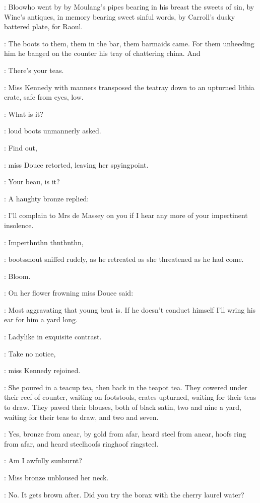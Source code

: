 :
Bloowho went by by Moulang's pipes bearing in his breast the sweets
of sin, by Wine's antiques, in memory bearing sweet sinful words, by
Carroll's dusky battered plate, for Raoul.

:
The boots to them, them in the bar, them barmaids came. For them
unheeding him
he banged on the counter his tray of chattering china.
And

\boots:
There's your teas.

:
Miss Kennedy with manners transposed the teatray down to an
upturned lithia crate, safe from eyes, low.

\boots:
What is it?

:
loud boots unmannerly asked.

\MissD:
Find out,

:
miss Douce retorted, leaving her spyingpoint.

\boots:
Your beau, is it?

:
A haughty bronze replied:

\MissD:
I'll complain to Mrs de Massey on you if I hear any more of your
impertinent insolence.

\boots:
Imperthnthn thnthnthn,

:
bootssnout sniffed rudely,
as he retreated as she
threatened as he had come.

:
Bloom.

:
On her flower frowning miss Douce said:

\MissD:
Most aggravating that young brat is. If he doesn't conduct himself
I'll wring his ear for him a yard long.

:
Ladylike in exquisite contrast.

\MissK:
Take no notice,

:
miss Kennedy rejoined.

:
She poured in a teacup tea, then back in the teapot tea. They cowered
under their reef of counter, waiting on footstools, crates upturned,
waiting for their teas to draw.
They pawed their blouses, both of black
satin, two and nine a yard, waiting for their teas to draw, and two and
seven.

:
Yes, bronze from anear, by gold from afar, heard steel from anear,
hoofs ring from afar, and heard steelhoofs ringhoof ringsteel.

\MissD:
Am I awfully sunburnt?

:
Miss bronze unbloused her neck.

\MissK:
No. It gets brown after. Did you try the borax with
the cherry laurel water?

